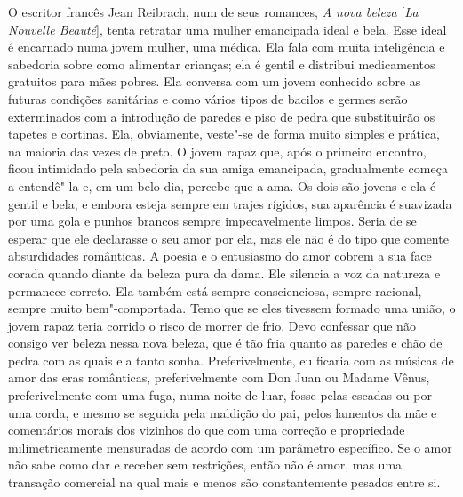 O escritor francês Jean Reibrach, num de seus romances, \emph{A nova
beleza} {[}\emph{La Nouvelle Beauté}{]}, tenta retratar uma mulher
emancipada ideal e bela. Esse ideal é encarnado numa jovem mulher, uma
médica. Ela fala com muita inteligência e sabedoria sobre como alimentar
crianças; ela é gentil e distribui medicamentos gratuitos para mães
pobres. Ela conversa com um jovem conhecido sobre as futuras condições
sanitárias e como vários tipos de bacilos e germes serão exterminados
com a introdução de paredes e piso de pedra que substituirão os tapetes
e cortinas. Ela, obviamente, veste"-se de forma muito simples e prática,
na maioria das vezes de preto. O jovem rapaz que, após o primeiro
encontro, ficou intimidado pela sabedoria da sua amiga emancipada,
gradualmente começa a entendê"-la e, em um belo dia, percebe que a ama.
Os dois são jovens e ela é gentil e bela, e embora esteja sempre em
trajes rígidos, sua aparência é suavizada por uma gola e punhos brancos
sempre impecavelmente limpos. Seria de se esperar que ele declarasse o
seu amor por ela, mas ele não é do tipo que comente absurdidades
românticas. A poesia e o entusiasmo do amor cobrem a sua face corada
quando diante da beleza pura da dama. Ele silencia a voz da natureza e
permanece correto. Ela também está sempre conscienciosa, sempre
racional, sempre muito bem"-comportada. Temo que se eles tivessem formado
uma união, o jovem rapaz teria corrido o risco de morrer de frio. Devo
confessar que não consigo ver beleza nessa nova beleza, que é tão fria
quanto as paredes e chão de pedra com as quais ela tanto sonha.
Preferivelmente, eu ficaria com as músicas de amor das eras românticas,
preferivelmente com Don Juan ou Madame Vênus, preferivelmente com uma
fuga, numa noite de luar, fosse pelas escadas ou por uma corda, e mesmo
se seguida pela maldição do pai, pelos lamentos da mãe e comentários
morais dos vizinhos do que com uma correção e propriedade
milimetricamente mensuradas de acordo com um parâmetro específico. Se o
amor não sabe como dar e receber sem restrições, então não é amor, mas
uma transação comercial na qual mais e menos são constantemente pesados
​​entre si.

